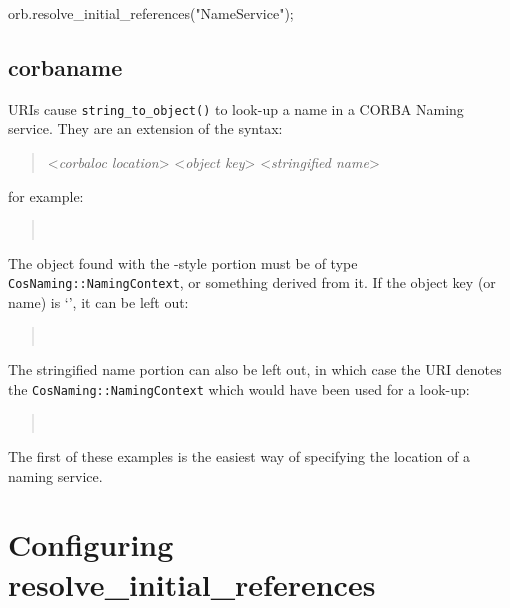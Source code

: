 \documentclass[11pt,oneside,a4paper]{book}
\newcommand{\intf}[1]{\texttt{#1}}
\newcommand{\op}[1]{\texttt{#1()}}
\newcommand{\dsc}{\discretionary{}{}{}}
\begin{document}
\begin{pylisting}
orb.resolve_initial_references("NameService");
\end{pylisting}




\subsection{corbaname}
\label{sec:corbaname}

 URIs cause \op{string\_to\_object} to look-up a
name in a CORBA Naming service. They are an extension of the
 syntax:

\begin{quote}
%
<\textit{corbaloc location}>%
\corbauri{/}%
<\textit{object key}>%
\corbauri{#}%
<\textit{stringified name}>
\end{quote}

\noindent for example:

\begin{quote}
\\
\end{quote}

\noindent The object found with the -style portion
must be of type \intf{CosNaming::\dsc{}NamingContext}, or something
derived from it. If the object key (or  name) is
`', it can be left out:

\begin{quote}
\\
\end{quote}

\noindent The stringified name portion can also be left out, in which
case the URI denotes the \intf{CosNaming::NamingContext} which would
have been used for a look-up:

\begin{quote}
\\
\end{quote}

\noindent The first of these examples is the easiest way of specifying
the location of a naming service.


\section{Configuring resolve\_initial\_references}
\label{sec:insargs}
\end{document}
